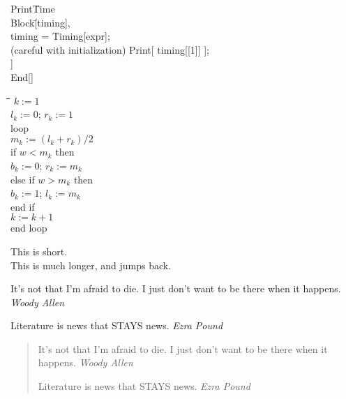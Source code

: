 \documentclass{amsart}
\begin{document}
\begin{ttfamily}
    \begin{tabbing}
        Print\=Time\\
        \>Block\=[timing],\\
        \>\>timing = Timing[expr];\\
        (careful with initialization)\kill
        \>\>Print[ timing[[1]] ];\\
        \>]\\
        End[]
    \end{tabbing}
\end{ttfamily}

\begin{ttfamily}
    \begin{tabbing}
        \hspace*{.25in}\=\hspace{2ex}\=\hspace{2ex}\=\hspace{2ex}\kill
        \> $k := 1$\\
        \> $l_k := 0$; $r_k := 1$\\
        \> loop\\
        \>\> $m_k := (l_k + r_k)/2$\\
        \>\> if $w < m_k$ then\\
        \>\>\> $b_k := 0$; $r_k := m_k$\\
        \>\> else if $w >m_k$ then\\
        \>\>\> $b_k := 1$; $l_k := m_k$\\
        \>\> end if\\
        \>\> $k := k+1$\\
        \> end loop
    \end{tabbing}
\end{ttfamily}

\begin{ttfamily}
    \begin{tabbing}
        This is short.\=\\
        This is much longer,\> and jumps back.
    \end{tabbing}
\end{ttfamily}

\clearpage

It's not that I'm afraid to die. I just don't
want to be there when it happens.
\emph{Woody Allen}

Literature is news that STAYS news.
\emph{Ezra Pound}

\begin{quote}
    It's not that I'm afraid to die. I just don't
    want to be there when it happens.
    \emph{Woody Allen}

    Literature is news that STAYS news.
    \emph{Ezra Pound}
\end{quote}
\end{document}
